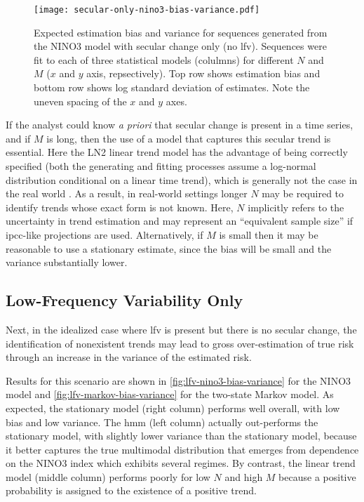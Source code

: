 \documentclass[
  draft,
  linenumbers
]{agujournal2018}
\begin{document}
\begin{figure}
  \centering
  \texttt{[image: secular-only-nino3-bias-variance.pdf]}
  \caption{
    Expected estimation bias and variance for sequences generated from the NINO3 model with secular change only (no \gls{lfv}).
    Sequences were fit to each of three statistical models (colulmns) for different $N$ and $M$ ($x$ and $y$ axis, repsectively).
    Top row shows estimation bias and bottom row shows log standard deviation of estimates.
    Note the uneven spacing of the $x$ and $y$ axes.
  }\label{fig:secular-nino3-bias-variance}
\end{figure}

If the analyst could know \emph{a priori} that secular change is present in a time series, and if $M$ is long, then the use of a model that captures this secular trend is essential.
Here the LN2 linear trend model has the advantage of being correctly specified (both the generating and fitting processes assume a log-normal distribution conditional on a linear time trend), which is generally not the case in the real world \citep{Serinaldi:2015bq, Montanari:2014hl}.
As a result, in real-world settings longer $N$ may be required to identify trends whose exact form is not known.
Here, $N$ implicitly refers to the uncertainty in trend estimation and may represent an ``equivalent sample size'' if \gls{ipcc}-like projections are used.
Alternatively, if $M$ is small then it may be reasonable to use a stationary estimate, since the bias will be small and the variance substantially lower.

\subsection{Low-Frequency Variability Only}

Next, in the idealized case where  \gls{lfv} is present but there is no secular change, the identification of nonexistent trends may lead to gross over-estimation of true risk through an increase in the variance of the estimated risk.

Results for this scenario are shown in \cref{fig:lfv-nino3-bias-variance} for the NINO3 model and \cref{fig:lfv-markov-bias-variance} for the two-state Markov model.
As expected, the stationary model (right column) performs well overall, with low bias and low variance.
The \gls{hmm} (left column) actually out-performs the stationary model, with slightly lower variance than the stationary model, because it better captures the true multimodal distribution that emerges from dependence on the NINO3 index which exhibits several regimes.
By contrast, the linear trend model (middle column) performs poorly for low $N$ and high $M$ because a positive probability is assigned to the existence of a positive trend.
\end{document}
